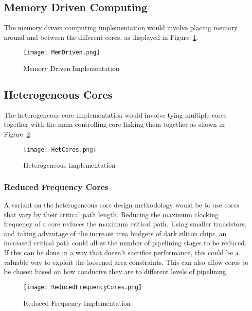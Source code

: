 	\subsection{Memory Driven Computing}
	The memory driven computing implementation would involve placing memory around and between the different cores, as displayed in Figure~\ref{MemDriven}.
	\begin{figure}
		\centering
		\texttt{[image: MemDriven.png]}
		\caption{Memory Driven Implementation}
		\label{MemDriven}
	\end{figure}

	\subsection{Heterogeneous Cores}
	The heterogeneous core implementation would involve tying multiple cores together with the main controlling core linking them together as shown in Figure~\ref{HetCores}.
	\begin{figure}
		\centering
		\texttt{[image: HetCores.png]}
		\caption{Heterogeneous Implementation}
		\label{HetCores}
	\end{figure}

	\subsubsection{Reduced Frequency Cores}
	A variant on the heterogeneous core design methodology would be to use cores that vary by their critical path length. Reducing the maximum clocking frequency of a core reduces the maximum critical path. Using smaller transistors, and taking advantage of the increase area budgets of dark silicon chips, an increased critical path could allow the number of pipelining stages to be reduced. If this can be done in a way that doesn't sacrifice performance, this could be a valuable way to exploit the loosened area constraints. This can also allow cores to be chosen based on how conducive they are to different levels of pipelining.
	\begin{figure}
		\centering
		\texttt{[image: ReducedFrequencyCores.png]}
		\caption{Reduced Frequency Implementation}
		\label{ReducedFreqCores}
	\end{figure}



	

